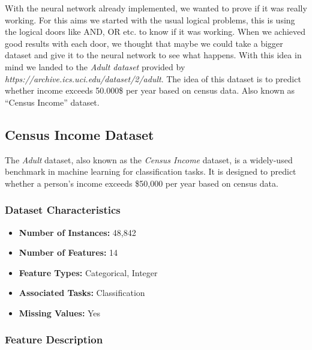 \documentclass{article}
\begin{document}
With the neural network already implemented, we wanted to prove if it was really working. For this aims we started with the usual logical problems, this is using the logical doors like AND, OR etc. to know if it was working. When we achieved good results with each door, we thought that maybe we could take a bigger dataset and give it to the neural network to see what happens. With this idea in mind we landed to the \textit{Adult dataset} provided by \textit{https://archive.ics.uci.edu/dataset/2/adult}. The idea of this dataset is to predict whether income exceeds 50.000\$ per year based on census data. Also known as ``Census Income'' dataset.

\subsection{Census Income Dataset}

The \textit{Adult} dataset, also known as the \textit{Census Income} dataset, is a widely-used benchmark in machine learning for classification tasks. It is designed to predict whether a person's income exceeds \$50,000 per year based on census data.

\subsubsection{Dataset Characteristics}

\begin{itemize}
    \item \textbf{Number of Instances:} 48,842
    \item \textbf{Number of Features:} 14
    \item \textbf{Feature Types:} Categorical, Integer
    \item \textbf{Associated Tasks:} Classification
    \item \textbf{Missing Values:} Yes
\end{itemize}

\subsubsection{Feature Description}
\end{document}
